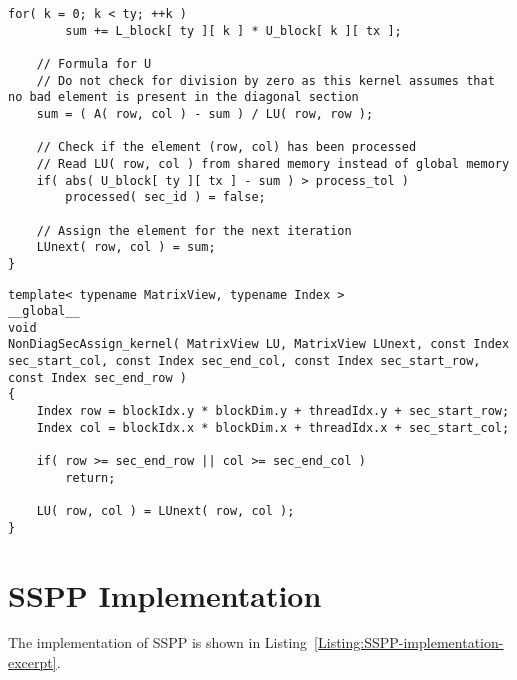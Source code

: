 \begin{lstlisting}[caption={The implementation of the \code{RSecCompute\_kernel()} kernel which computes one iteration of a right section.},label={Listing:ICMxPP-implementation->kernels->right-section-compute}]
	for( k = 0; k < ty; ++k )
		sum += L_block[ ty ][ k ] * U_block[ k ][ tx ];
	
	// Formula for U
	// Do not check for division by zero as this kernel assumes that no bad element is present in the diagonal section
	sum = ( A( row, col ) - sum ) / LU( row, row );
	
	// Check if the element (row, col) has been processed
	// Read LU( row, col ) from shared memory instead of global memory
	if( abs( U_block[ ty ][ tx ] - sum ) > process_tol )
		processed( sec_id ) = false;
	
	// Assign the element for the next iteration
	LUnext( row, col ) = sum;
}
\end{lstlisting}

\begin{lstlisting}[caption={The implementation of the \code{NonDiagSecAssign\_kernel()} kernel that assigns values of the next iteration to the matrix representing the current iteration.},label={Listing:ICMxPP-implementation->kernels->nondiagonal-assign}]
template< typename MatrixView, typename Index >
__global__
void
NonDiagSecAssign_kernel( MatrixView LU, MatrixView LUnext, const Index sec_start_col, const Index sec_end_col, const Index sec_start_row, const Index sec_end_row )
{
	Index row = blockIdx.y * blockDim.y + threadIdx.y + sec_start_row;
	Index col = blockIdx.x * blockDim.x + threadIdx.x + sec_start_col;
	
	if( row >= sec_end_row || col >= sec_end_col )
		return;
	
	LU( row, col ) = LUnext( row, col );
}
\end{lstlisting}





\chapter{SSPP Implementation}\label{Appendix:SSPP-implementation}
The implementation of SSPP is shown in Listing~\ref{Listing:SSPP-implementation-excerpt}.

